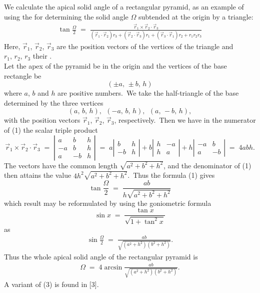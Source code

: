 \documentclass[12pt]{article}
\theoremstyle{definition}
\begin{document}
 
We calculate the apical solid angle of a  rectangular pyramid, as an example of using the  for determining the solid angle $\Omega$ subtended at the origin by a triangle:
\begin{align}
\tan\frac{\Omega}{2} \;=\; \frac{\vec{r}_1\!\times\!\vec{r}_2\!\cdot\!\vec{r}_3}
{(\vec{r}_1\!\cdot\!\vec{r}_2)r_3+(\vec{r}_2\!\cdot\!\vec{r}_3)r_1+(\vec{r}_3\!\cdot\!\vec{r}_1)r_2+r_1r_2r_3}
\end{align}
Here, $\vec{r}_1$, $\vec{r}_2$, $\vec{r}_3$ are the position vectors of the vertices of the triangle and 
$r_1,\,r_2,\,r_3$ their .\\

Let the apex of the pyramid be in the origin and the vertices of the base rectangle be
$$(\pm a,\, \pm b,\, h)$$
where $a$, $b$ and $h$ are positive numbers.\, We take the half-triangle of the base determined by the three vertices
$$(a,\,b,\,h), \;\, (-a,\,b,\,h), \;\, (a,\,-b,\,h),$$
with the position vectors $\vec{r}_1$, $\vec{r}_2$, $\vec{r}_3$, respectively.\, Then we have in the numerator of (1) the scalar triple product 
$$\vec{r}_1\!\times\!\vec{r}_2\!\cdot\!\vec{r}_3 \;=\; 
\left|\begin{matrix}
a & b & h\\
-a & b & h\\
a & -b & h 
\end{matrix}\right| \;=\; 
a\left|\begin{matrix} 
b & h\\
-b & h
\end{matrix}\right|+ 
b\left|\begin{matrix} 
h & -a\\
h & a
\end{matrix}\right|+
h\left|\begin{matrix}
-a & b\\
a & -b
\end{matrix}\right| \;=\; 4abh.
$$
The vectors have the common length $\sqrt{a^2\!+\!b^2\!+\!h^2}$, and the denominator of (1) then attains the value 
$4h^2\sqrt{a^2\!+\!b^2\!+\!h^2}$.\, Thus the formula (1) gives
$$\tan\frac{\Omega}{2} \;=\; \frac{ab}{h\sqrt{a^2\!+\!b^2\!+\!h^2}}$$
which result may be reformulated by using the goniometric formula
$$\sin x \;=\; \frac{\tan x}{\sqrt{1+\tan^2 x}}$$
as
\begin{align}
\sin\frac{\Omega}{2} \;=\; \frac{ab}{\sqrt{(a^2\!+\!h^2)(b^2\!+\!h^2)}}.
\end{align}
Thus the whole apical solid angle of the  rectangular pyramid is
\begin{align}
\Omega \;=\; 4\arcsin\frac{ab}{\sqrt{(a^2\!+\!h^2)(b^2\!+\!h^2)}}.
\end{align}
A variant of (3) is found in [3].\\
\end{document}
